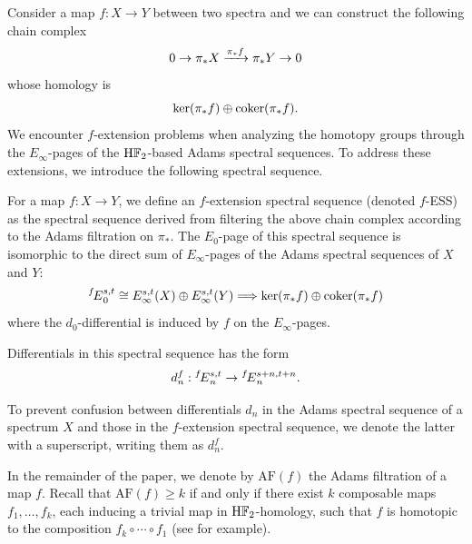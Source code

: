 \documentclass{amsart}
\numberwithin{equation}{section}
\newcommand{\AF}{\mathrm{AF}}
\newcommand{\ESS}[1]{\prescript{#1\!}{}{E}}
\newcommand{\HF}{\mathrm{H}\bF_2}
\begin{document}
Consider a map $f: X\to Y$ between two spectra and we can construct the following chain complex
$$0\to \pi_*X\xrightarrow{\pi_*f} \pi_*Y\to 0$$
whose homology is 
$$\operatorname{ker}(\pi_*f)\oplus \operatorname{coker}(\pi_*f).$$
We encounter $f$-extension problems when analyzing the homotopy groups through the $E_\infty$-pages of the $\HF$-based Adams spectral sequences. To address these extensions, we introduce the following spectral sequence.



\begin{definition}\label{def:ess}
  For a map $f: X\to Y$, we define an $f$-extension spectral sequence (denoted $f$-ESS) as the spectral sequence derived from filtering the above chain complex according to the Adams filtration on $\pi_*$. The $E_0$-page of this spectral sequence is isomorphic to the direct sum of $E_\infty$-pages of the Adams spectral sequences of $X$ and $Y$: 
  $$\ESS{f}_0^{s,t} \cong E_\infty^{s,t}(X) \oplus E_\infty^{s,t}(Y) \Longrightarrow \Ker(\pi_*f)\oplus \Coker(\pi_*f)$$
  where the $d_0$-differential is induced by $f$ on the $E_\infty$-pages.
  
  Differentials in this spectral sequence has the form
  $$d_n^{f}: \ESS{f}_n^{s,t}\to \ESS{f}_n^{s+n, t+n}.$$
\end{definition}

To prevent confusion between differentials $d_n$ in the Adams spectral sequence of a spectrum $X$ and those in the $f$-extension spectral sequence, we denote the latter with a superscript, writing them as $d_n^{f}$. 

In the remainder of the paper, we denote by $\AF(f)$ the Adams filtration of a map $f$. Recall that $\AF(f) \ge k$ if and only if there exist $k$ composable maps $f_1, \ldots, f_k$, each inducing a trivial map in $\HF$-homology, such that $f$ is homotopic to the composition $f_k \circ \cdots \circ f_1$ (see \cite[Theorem~2.2.14]{RavenelGreenbook} for example).
\end{document}
